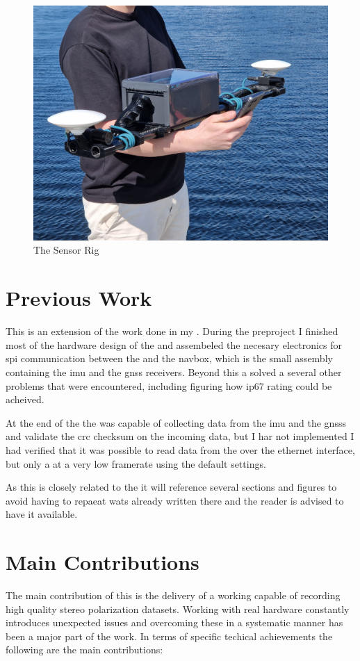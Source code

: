 \begin{figure}[H]
    \includegraphics[width=\textwidth]{figures/frontpage.jpg}
    \caption{The Sensor Rig}
\end{figure}

\section{Previous Work}
This \master is an extension of the work done in my \preproject \cite{martensPortableSensorRig2022}.
During the preproject I finished most of the hardware design of the \sr
and assembeled the necesary electronics for \gls{spi} communication between the \jx and the \gls{navbox}, which is the small assembly containing the \gls{imu} and the \gls{gnss} receivers.
Beyond this a solved a several other problems that were encountered, including figuring how \gls{ip67} rating could be acheived.

At the end of the \preproject the \sr was capable of collecting data from the \gls{imu} and the \glspl{gnss} and validate the \gls{crc} checksum on the incoming data, but I har not implemented
I had verified that it was possible to read data from the \cams over the ethernet interface, but only a at a very low framerate using the default settings.

As this \master is closely related to the \preproject it will reference several sections and figures to avoid having to repaeat wats already written there and the reader is advised to have it available.

\section{Main Contributions}
The main contribution of this \master is the delivery of a working \sr capable of recording high quality stereo polarization datasets.
Working with real hardware constantly introduces unexpected issues and overcoming these in a systematic manner has been a major part of the work.
In terms of specific techical achievements the following are the main contributions:

